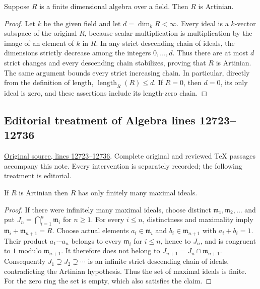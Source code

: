 \begin{lemma}
\label{editorial-source-lemma-finite-dimensional-algebra}
Suppose $R$ is a finite dimensional algebra over a field.
Then $R$ is Artinian.
\end{lemma}

\begin{proof}
Let $k$ be the given field and let $d=\dim_k R<\infty$.
Every ideal is a $k$-vector subspace of the original $R$,
because scalar multiplication is multiplication by the image
of an element of $k$ in $R$. In any strict descending chain
of ideals, the dimensions strictly decrease among the integers
$0,\ldots,d$. Thus there are at most $d$ strict changes and
every descending chain stabilizes, proving that $R$ is Artinian.
The same argument bounds every strict increasing chain.
In particular, directly from the definition of length,
$\operatorname{length}_R(R)\leq d$.
If $R=0$, then $d=0$, its only ideal is zero, and these
assertions include its length-zero chain.
\end{proof}


\subsection{Editorial treatment of Algebra lines 12723--12736}

\hypertarget{algebra-context-167}{}

\noindent\href{https://github.com/stacks/stacks-project/blob/a04446e57ec1fbc252a871afcec7752fb2807b14/algebra.tex\#L12723}{Original source, lines 12723--12736}. Complete original and reviewed TeX passages accompany this note. Every intervention is separately recorded; the following treatment is editorial.


\begin{lemma}
\label{editorial-source-lemma-artinian-finite-nr-max}
If $R$ is Artinian then $R$ has only finitely many maximal ideals.
\end{lemma}

\begin{proof}
If there were infinitely many maximal ideals, choose distinct
$\mathfrak m_1,\mathfrak m_2,\ldots$ and put
$J_n=\bigcap_{i=1}^n\mathfrak m_i$ for $n\geq1$.
For every $i\leq n$, distinctness and maximality imply
$\mathfrak m_i+\mathfrak m_{n+1}=R$. Choose actual elements
$a_i\in\mathfrak m_i$ and $b_i\in\mathfrak m_{n+1}$ with
$a_i+b_i=1$. Their product
$a_1\cdots a_n$ belongs to every $\mathfrak m_i$ for
$i\leq n$, hence to $J_n$, and is congruent to $1$ modulo
$\mathfrak m_{n+1}$. It therefore does not belong to
$J_{n+1}=J_n\cap\mathfrak m_{n+1}$.
Consequently $J_1\supsetneq J_2\supsetneq\cdots$ is an
infinite strict descending chain of ideals, contradicting the
Artinian hypothesis. Thus the set of maximal ideals is finite.
For the zero ring the set is empty, which also satisfies the claim.
\end{proof}


